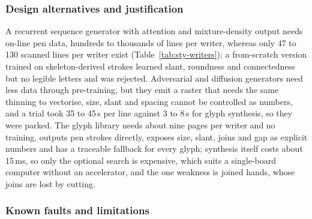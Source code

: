 \subsubsection{Design alternatives and justification}

A recurrent sequence generator with attention and mixture-density output needs on-line pen data, hundreds to thousands of lines per writer, whereas only 47 to 130 scanned lines per writer exist (Table~\ref{tab:sty-writers}); a from-scratch version trained on skeleton-derived strokes learned slant, roundness and connectedness but no legible letters and was rejected.
Adversarial and diffusion generators need less data through pre-training, but they emit a raster that needs the same thinning to vectorise, size, slant and spacing cannot be controlled as numbers, and a trial took 35 to 45\,s per line against 3 to 8\,s for glyph synthesis, so they were parked.
The glyph library needs about nine pages per writer and no training, outputs pen strokes directly, exposes size, slant, joins and gap as explicit numbers and has a traceable fallback for every glyph; synthesis itself costs about 15\,ms, so only the optional search is expensive, which suits a single-board computer without an accelerator, and the one weakness is joined hands, whose joins are lost by cutting.

\subsubsection{Known faults and limitations}
\label{sec:syn-faults}

